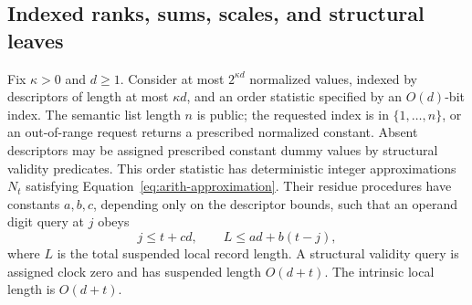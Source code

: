 \subsection{Indexed ranks, sums, scales, and structural leaves}

\begin{lemma}
\label{lem:arith-rank}
Fix $\kappa>0$ and $d\geq1$.  Consider at most $2^{\kappa d}$
normalized values, indexed by descriptors of length at most
$\kappa d$, and an order statistic specified by an $O(d)$-bit
index.  The semantic list length $n$ is public; the requested index
is in $\{1,\ldots,n\}$, or an out-of-range request returns a
prescribed normalized constant.  Absent descriptors may be assigned
prescribed constant dummy values by structural validity predicates.
This order statistic has deterministic integer approximations $N_t$
satisfying Equation~\eqref{eq:arith-approximation}.  Their residue
procedures have constants $a,b,c$, depending only on the descriptor
bounds, such that an operand digit query at $j$ obeys
\begin{equation}
 j\leq t+cd,\qquad
 L\leq ad+b(t-j),
 \label{eq:arith-local-bound}
\end{equation}
where $L$ is the total suspended local record length.  A structural
validity query is assigned clock zero and has suspended length
$O(d+t)$.  The intrinsic local length is $O(d+t)$.
\end{lemma}

